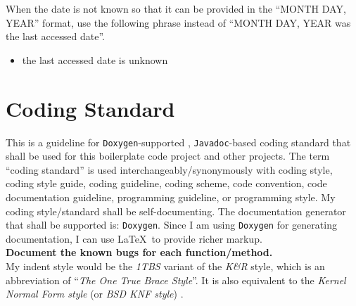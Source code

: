 \documentclass[letter,12pt]{article}
\begin{document}
When the date is not known so that it can be provided in the ``MONTH DAY, YEAR'' format, use the following phrase instead of ``MONTH DAY, YEAR was the last accessed date''. \vspace{-0.3cm}
\begin{itemize} \itemsep -4pt
\item the last accessed date is unknown
\end{itemize}














\section{Coding Standard}
\label{sec:CodingStandard}

This is a guideline for {\tt Doxygen}-supported \cite{vanHeesch2016}, {\tt Javadoc}-based \cite{Long1995} coding standard that shall be used for this boilerplate code project and other projects. The term ``coding standard'' is used interchangeably/synonymously with coding style, coding style guide, coding guideline, coding scheme, code convention, code documentation guideline, programming guideline, or programming style. My coding style/standard shall be self-documenting. The documentation generator that shall be supported is: {\tt Doxygen}. Since I am using {\tt Doxygen} for generating documentation, I can use \LaTeX\ to provide richer markup. \\

{\bf Document the known bugs for each function/method.} \\

My indent style would be the {\it 1TBS} variant of the {\it K{\rm \&}R} style, which is an abbreviation of ``{\it The One True Brace Style}''. It is also equivalent to the {\it Kernel Normal Form style} (or {\it BSD KNF style}) \cite{WikipediaContributors2016j}. \\
\end{document}
